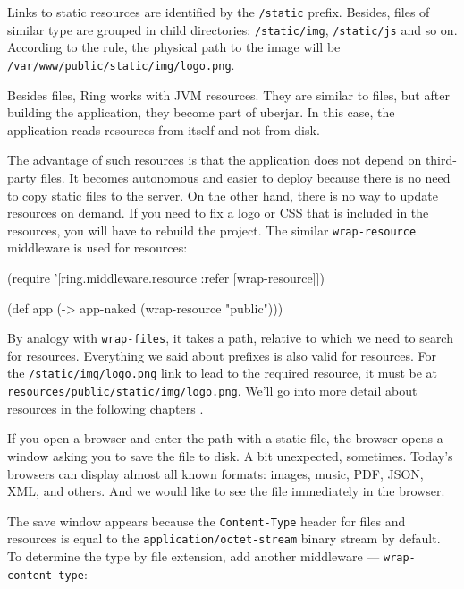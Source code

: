 Links to static resources are identified by the \verb|/static| prefix. Besides, files of similar type are grouped in child directories: \verb|/static/img|, \verb|/static/js| and so on. According to the rule, the physical path to the image will be \verb|/var/www/public/static/img/logo.png|.

Besides files, Ring works with JVM resources. They are similar to files, but after building the application, they become part of uberjar. In this case, the application reads resources from itself and not from disk.

The advantage of such resources is that the application does not depend on third-party files. It becomes autonomous and easier to deploy because there is no need to copy static files to the server. On the other hand, there is no way to update resources on demand. If you need to fix a logo or CSS that is included in the resources, you will have to rebuild the project. The similar \verb|wrap-resource| middleware is used for resources:


\begin{english}
  \begin{clojure}
(require '[ring.middleware.resource
           :refer [wrap-resource]])

(def app (-> app-naked
             (wrap-resource "public")))
  \end{clojure}
\end{english}

By analogy with \verb|wrap-files|, it takes a path, relative to which we need to search for resources. Everything we said about prefixes is also valid for resources. For the \verb|/static/img/logo.png| link to lead to the required resource, it must be at \verb|resources/public/static/img/logo.png|. We'll go into more detail about resources in the following chapters .

If you open a browser and enter the path with a static file, the browser opens a window asking you to save the file to disk. A bit unexpected, sometimes. Today's browsers can display almost all known formats:
images, music, PDF, JSON, XML, and others. And we would like to see the file immediately in the browser.

The save window appears because the \verb|Content-Type| header for files and resources is equal to the \verb|application/octet-stream| binary stream by default. To determine the type by file extension, add another middleware — \verb|wrap-content-type|:

